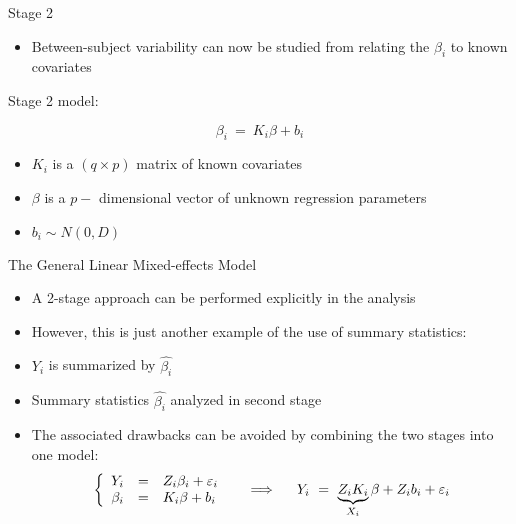 \documentclass{beamer}
\begin{document}
\begin{frame}{Stage 2}
\begin {itemize}
\item Between-subject variability can now be studied from relating the $\beta_{i}$ to known covariates
\end {itemize}

Stage 2 model:

\[  \beta_{i} \ = \ K_{i} \beta + b_{i}  \]

\begin {itemize}

\item  $ K_{i} $ is a $(q \times p)$ matrix of known covariates

\item $ \beta $ is a $p-$ dimensional vector of unknown regression parameters

\item $ b_{i} \sim N(0, D)$
\end {itemize}
\end{frame}

\begin{frame}{The General Linear Mixed-effects Model}

\begin{itemize}
\item A 2-stage approach can be performed explicitly in the analysis
\item However, this is just another example of the use of  summary statistics:
\item $Y_{i} $ is summarized by $ \widehat{\beta_{i}} $
\item Summary statistics $\widehat{\beta_{i}}$ analyzed in second stage
\item The associated drawbacks can be avoided  by combining the two stages into one model:
\begin{eqnarray*}
\left\{\begin{array}{rcl}
Y_{i} & = & Z_{i}  \beta_{i} + \varepsilon_{i} \\
\beta_{i} & = & K_{i} \beta + b_{i}
\end{array}\right.
\hspace*{0.5cm} \Longrightarrow \hspace*{0.5cm}
Y_{i} \ = \ \underbrace{Z_i K_i}_{X_i}
\beta  +  Z_{i} b_{i}  +  \varepsilon_{i} 
\end{eqnarray*}
\end {itemize}
\end{frame}
\end{document}

